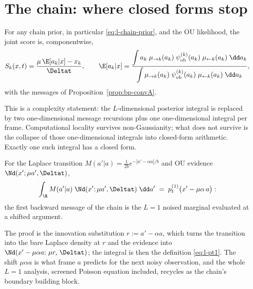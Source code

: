 \section{The chain: where closed forms stop}\label{sec:l-chain}

\begin{theorem}\label{thm:l-markov-score}
For any chain prior, in particular \eqref{eq:l-chain-prior}, and the OU
likelihood, the joint score is, componentwise,
\begin{equation}
  S_k(x, t) = \frac{\mu\, \E[a_k | x] - x_k}{\Deltat},
  \qquad
  \E[a_k | x]
  = \frac{\displaystyle\int a_k\; \mu_{\to k}(a_k)\;
      \psi^{(k)}_{\mathrm{ob}}(a_k)\;
      \mu_{\leftarrow k}(a_k)\;\dd a_k}
     {\displaystyle\int \mu_{\to k}(a_k)\;
      \psi^{(k)}_{\mathrm{ob}}(a_k)\;
      \mu_{\leftarrow k}(a_k)\;\dd a_k},
  \label{eq:l-markov-score}
\end{equation}
with the messages of Proposition~\ref{prop:bp-convA}.
\end{theorem}

This is a complexity statement: the $L$-dimensional posterior integral is
replaced by two one-dimensional message recursions plus one
one-dimensional integral per frame. Computational locality survives
non-Gaussianity; what does not survive is the collapse of those
one-dimensional integrals into closed-form arithmetic. Exactly one such
integral has a closed form.

\begin{proposition}\label{prop:l-onestep}
For the Laplace transition $M(a'|a) = \frac{1}{2b} e^{-|a' - \alpha a|/b}$
and OU evidence $\Nd(x'; \mu a', \Deltat)$,
\begin{equation}
  \int_\R M(a' | a)\; \Nd(x'; \mu a', \Deltat)\; \dd a'
  \;=\; p_t^{(1)}\big( x' - \mu\alpha\, a \big) :
  \label{eq:l-onestep}
\end{equation}
the first backward message of the chain is the $L = 1$ noised marginal
evaluated at a shifted argument.
\end{proposition}

The proof is the innovation substitution $r := a' - \alpha a$, which
turns the transition into the bare Laplace density at $r$ and the
evidence into $\Nd(x' - \mu\alpha a;\, \mu r,\, \Deltat)$; the integral
is then the definition \eqref{eq:l-pt1}. The shift $\mu\alpha a$ is what
frame $a$ predicts for the next noisy observation, and the whole $L = 1$
analysis, screened Poisson equation included, recycles as the chain's
boundary building block.

